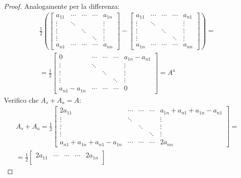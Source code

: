 \begin{proof}
Analogamente per la differenza:
\begin{displaymath}
\begin{split}
\frac{1}{2}
\left (
\begin{bmatrix}
a_{11} & \cdots & \cdots &\cdots & a_{1n} \\
\vdots & \ddots &		&		& \vdots\\
\vdots &  		& \ddots & 		& \vdots\\
\vdots & 		&		& \ddots & \vdots\\
a_{n1} & \cdots & \cdots &\cdots & a_{nn}
\end{bmatrix} - 
\begin{bmatrix}
a_{11} & \cdots & \cdots &\cdots & a_{n1} \\
\vdots & \ddots &		&		& \vdots\\
\vdots &  		& \ddots & 		& \vdots\\
\vdots & 		&		& \ddots & \vdots\\
a_{1n} & \cdots & \cdots &\cdots & a_{nn}
\end{bmatrix} \right ) = \\
= \frac{1}{2} 
\begin{bmatrix}
0 & \cdots & \cdots &\cdots & a_{1n} - a_{n1} \\
\vdots & \ddots &		&		& \vdots\\
\vdots &  		& \ddots & 		& \vdots\\
\vdots & 		&		& \ddots & \vdots\\
a_{n1} - a_{1n}& \cdots & \cdots &\cdots & 0
\end{bmatrix} = A^{a}
\end{split}
\end{displaymath}
Verifico che $A_{s} + A_{a} = A$:
\begin{displaymath}
\begin{split}
A_{s} + A_{a} = 
\frac{1}{2}
\begin{bmatrix}
2a_{11} & \cdots & \cdots &\cdots & a_{1n} + a_{n1} + a_{1n} - a_{n1}\\
\vdots & \ddots &		&		& \vdots\\
\vdots &  		& \ddots & 		& \vdots\\
\vdots & 		&		& \ddots & \vdots\\
a_{n1} + a_{1n} + a_{n1} - a_{1n} & \cdots & \cdots &\cdots & 2a_{nn}
\end{bmatrix} = \\
= \frac{1}{2}
\begin{bmatrix}
2a_{11} & \cdots & \cdots &\cdots & 2a_{1n}\\

\end{bmatrix}
\end{split}
\end{displaymath}
\end{proof}
